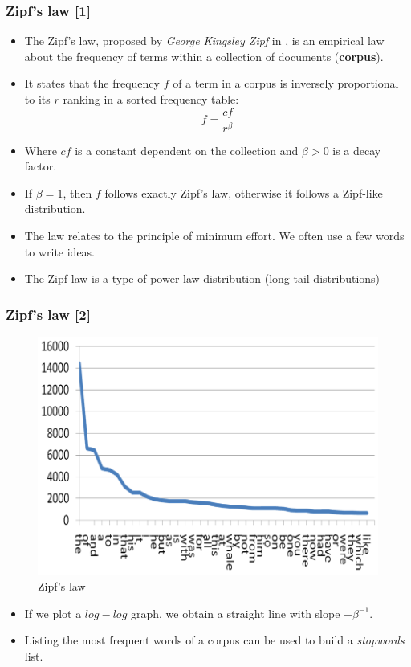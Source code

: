 \documentclass[handout]{beamer}
\begin{document}
\begin{frame}\frametitle{Zipf's law [1]}
\footnotesize{
\begin{itemize}
\item The Zipf's law, proposed by \emph{George Kingsley Zipf} in \cite{zipf1935}, is an empirical law about the frequency of terms within a collection of documents (\textbf{corpus}). 
\item It states that the frequency $f$ of a term in a corpus is inversely proportional to its $r$ ranking in a sorted frequency table:
\begin{equation}
	f = \frac{cf}{r^{\beta}}
\end{equation}
\item Where $cf$ is a constant dependent on the collection and $\beta > 0$ is a decay factor.
\item If $\beta = 1$, then $f$ follows exactly Zipf's law, otherwise it follows a Zipf-like distribution. 

\item The law relates to the principle of minimum effort. We often use a few words to write ideas.

\item The Zipf law is a type of power law distribution (long tail distributions)


\end{itemize}


}
 
\end{frame}


\begin{frame}\frametitle{Zipf's law [2]}
\footnotesize{

\begin{figure}[h!]
	\centering
	\includegraphics[scale=0.5]{pics/zipf1.png}
	\caption{Zipf's law}
\end{figure}
\begin{itemize}
 \item If we plot a $log-log$ graph, we obtain a straight line with slope  $-\beta^{-1}$.
 \item Listing the most frequent words of a corpus can be used to build a \emph{stopwords} list. 
\end{itemize}
}



 
\end{frame}
\end{document}

